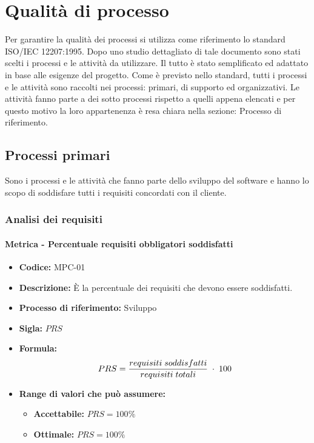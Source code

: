 \section{Qualità di processo}
Per garantire la qualità dei processi si utilizza come riferimento lo standard ISO/IEC 12207:1995. Dopo uno studio dettagliato di tale documento sono stati scelti i processi
e le attività da utilizzare. Il tutto è stato semplificato ed adattato in base alle esigenze del progetto. Come è previsto nello standard, tutti i processi e le attività sono raccolti 
nei processi: primari, di supporto ed organizzativi. Le attività fanno parte a dei sotto processi rispetto a quelli appena elencati e per questo motivo la loro 
appartenenza è resa chiara nella sezione: Processo di riferimento.

\subsection{Processi primari}
Sono i processi e le attività che fanno parte dello sviluppo del software e hanno lo scopo di soddisfare tutti i requisiti concordati con il cliente.

\subsubsection{Analisi dei requisiti}
    \paragraph{Metrica - Percentuale requisiti obbligatori soddisfatti}
    \begin{itemize}
        \item \textbf{Codice:} MPC-01
        \item \textbf{Descrizione:} È la percentuale dei requisiti che devono essere soddisfatti.
        \item \textbf{Processo di riferimento:} Sviluppo
        \item \textbf{Sigla:} $PRS$
        \item \textbf{Formula:} $$PRS = {requisiti \; soddisfatti \over requisiti \; totali}\; \cdot \; 100$$
        \item \textbf{Range di valori che può assumere:}
        \begin{itemize}
            \item \textbf{Accettabile:} $PRS = 100\%$
            \item \textbf{Ottimale:} $PRS = 100\%$
        \end{itemize}
    \end{itemize} 
